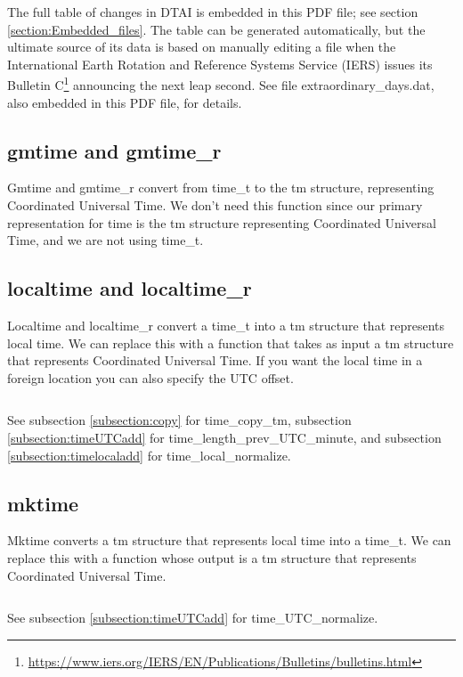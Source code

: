 \documentclass[letterpaper,twoside]{article}
\begin{document}
The full table of changes in DTAI is embedded in this PDF file;
see section \ref{section:Embedded_files}.
The table can be generated automatically\citep{JBS_001}, but the ultimate
source of its data is based on manually editing a file when the
International Earth Rotation and Reference Systems Service (IERS)
issues its Bulletin
C\footnote{\url{https://www.iers.org/IERS/EN/Publications/Bulletins/bulletins.html}}
announcing the next leap second.  See file
{\ttfamily extraordinary\_days.dat}, also embedded in this PDF file,
for details.

\subsection{gmtime and gmtime\_r}
Gmtime and gmtime\_r convert from {\ttfamily time\_t} to
the {\ttfamily tm} structure,
representing Coordinated Universal Time.  We don't
need this function since our primary representation for time is the
{\ttfamily tm} structure representing Coordinated Universal Time,
and we are not using {\ttfamily time\_t}.

\subsection{localtime and localtime\_r}
\label{subsection:localtime}
Localtime and localtime\_r convert a {\ttfamily time\_t} into
a {\ttfamily tm} structure that
represents local time.  We can replace this with a function that takes
as input a {\ttfamily tm} structure that represents Coordinated Universal Time.
If you want the local time in a foreign location you can also specify
the UTC offset.
\inputminted[firstline=32]{c}{src/time_utc_to_local.c}
See subsection \ref{subsection:copy} for time\_copy\_tm,
subsection \ref{subsection:timeUTCadd} for
time\_\-length\_\-prev\_\-UTC\_\-minute,
and subsection \ref{subsection:timelocaladd} for time\_local\_normalize.

\subsection{mktime}
\label{subsection:mktime}
Mktime converts a {\ttfamily tm} structure that represents local time into a
{\ttfamily time\_t}.  We can replace this with a function whose output is a
{\ttfamily tm} structure that represents Coordinated Universal Time.
\inputminted[firstline=32]{c}{src/time_local_to_utc.c}
See subsection \ref{subsection:timeUTCadd} for time\_UTC\_normalize.
\end{document}
